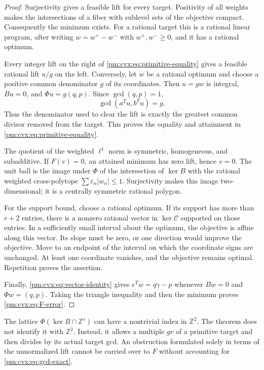\documentclass[11pt,a4paper]{article}
\newcommand{\Z}{\mathbb Z}
\theoremstyle{definition}
\theoremstyle{remark}
\numberwithin{equation}{section}
\begin{document}
\begin{proof}
Surjectivity gives a feasible lift for every target.  Positivity of all
weights makes the intersections of a fiber with sublevel sets of the
objective compact.  Consequently the minimum exists.  For a rational
target this is a rational linear program, after writing
$w=w^+-w^-$ with $w^+,w^-\ge0$, and it has a rational optimum.

Every integer lift on the right of
\eqref{pm:cvx:eq:primitive-equality} gives a feasible rational lift $u/g$
on the left.  Conversely, let $w$ be a rational optimum and choose a
positive common denominator $g$ of its coordinates.  Then $u=gw$ is
integral, $Bu=0$, and $\Phi u=g(q,p)$.  Since $\gcd(q,p)=1$,
\begin{equation}\label{pm:cvx:eq:gcd-exact}
 \gcd(a^Tu,b^Tu)=g.
\end{equation}
Thus the denominator used to clear the lift is exactly the greatest
common divisor removed from the target.  This proves the equality and
attainment in \eqref{pm:cvx:eq:primitive-equality}.

The quotient of the weighted $\ell^1$ norm is symmetric, homogeneous,
and subadditive.  If $F(v)=0$, an attained minimum has zero lift, hence
$v=0$.  The unit ball is the image under $\Phi$ of the intersection
of $\ker B$ with the rational weighted cross-polytope
$\sum\varepsilon_n|w_n|\le1$.  Surjectivity makes this image
two-dimensional; it is a centrally symmetric rational polygon.

For the support bound, choose a rational optimum.  If its support has
more than $r+2$ entries, there is a nonzero rational vector in
$\ker\mathcal C$ supported on those entries.  In a sufficiently small
interval about the optimum, the objective is affine along this vector.
Its slope must be zero, or one direction would improve the objective.
Move to an endpoint of the interval on which the coordinate signs are
unchanged.  At least one coordinate vanishes, and the objective remains
optimal.  Repetition proves the assertion.

Finally, \eqref{pm:cvx:eq:vector-identity} gives
$e^Tw=q\gamma-p$ whenever $Bw=0$ and $\Phi w=(q,p)$.
Taking the triangle inequality and then the minimum proves
\eqref{pm:cvx:eq:F-error}.
\end{proof}

The lattice $\Phi(\ker B\cap\Z^s)$ can have a nontrivial index in
$\Z^2$.  The theorem does not identify it with $\Z^2$.
Instead, it allows a multiple $gv$ of a primitive target and then
divides by its actual target gcd.  An obstruction formulated solely in
terms of the unnormalized lift cannot be carried over to $F$ without
accounting for \eqref{pm:cvx:eq:gcd-exact}.
\end{document}
